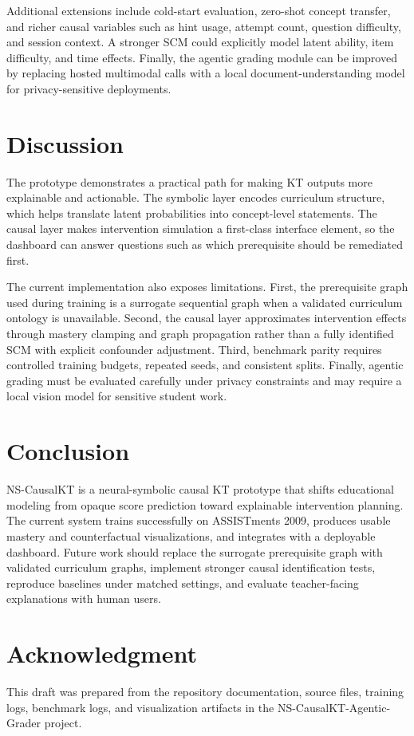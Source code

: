 \documentclass[conference]{IEEEtran}
\begin{document}
Additional extensions include cold-start evaluation, zero-shot concept transfer, and richer causal variables such as hint usage, attempt count, question difficulty, and session context. A stronger SCM could explicitly model latent ability, item difficulty, and time effects. Finally, the agentic grading module can be improved by replacing hosted multimodal calls with a local document-understanding model for privacy-sensitive deployments.

\section{Discussion}
The prototype demonstrates a practical path for making KT outputs more explainable and actionable. The symbolic layer encodes curriculum structure, which helps translate latent probabilities into concept-level statements. The causal layer makes intervention simulation a first-class interface element, so the dashboard can answer questions such as which prerequisite should be remediated first.

The current implementation also exposes limitations. First, the prerequisite graph used during training is a surrogate sequential graph when a validated curriculum ontology is unavailable. Second, the causal layer approximates intervention effects through mastery clamping and graph propagation rather than a fully identified SCM with explicit confounder adjustment. Third, benchmark parity requires controlled training budgets, repeated seeds, and consistent splits. Finally, agentic grading must be evaluated carefully under privacy constraints and may require a local vision model for sensitive student work.

\section{Conclusion}
NS-CausalKT is a neural-symbolic causal KT prototype that shifts educational modeling from opaque score prediction toward explainable intervention planning. The current system trains successfully on ASSISTments 2009, produces usable mastery and counterfactual visualizations, and integrates with a deployable dashboard. Future work should replace the surrogate prerequisite graph with validated curriculum graphs, implement stronger causal identification tests, reproduce baselines under matched settings, and evaluate teacher-facing explanations with human users.

\section*{Acknowledgment}
This draft was prepared from the repository documentation, source files, training logs, benchmark logs, and visualization artifacts in the NS-CausalKT-Agentic-Grader project.



\end{document}
